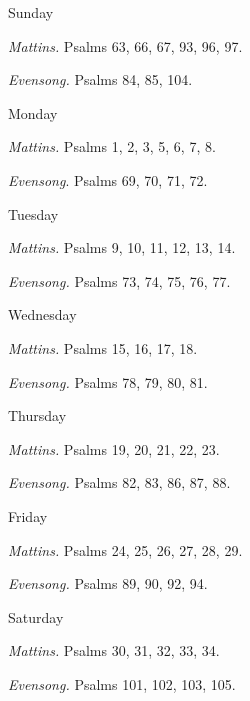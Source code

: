 \begin{paracol}{2}%
	\begin{leftcolumn}
		\begin{inhead}
			Sunday
		\end{inhead}\par\noindent
		\textit{Mattins.} Psalms 63, 66, 67, 93, 96, 97.\par\noindent
		\textit{Evensong.} Psalms 84, 85, 104.\par
		\begin{inhead}
			Monday
		\end{inhead}\par\noindent
		\textit{Mattins.} Psalms 1, 2, 3, 5, 6, 7, 8.\par\noindent
		\textit{Evensong}. Psalms 69, 70, 71, 72.\par
		\begin{inhead}
			Tuesday
		\end{inhead}\par\noindent
		\textit{Mattins.} Psalms 9, 10, 11, 12, 13, 14.\par\noindent
		\textit{Evensong.} Psalms 73, 74, 75, 76, 77.\par
		\begin{inhead}
			Wednesday
		\end{inhead}\par\noindent
		\textit{Mattins.} Psalms 15, 16, 17, 18.\par\noindent
		\textit{Evensong.} Psalms 78, 79, 80, 81.\par
		\begin{inhead}
			Thursday
		\end{inhead}\par\noindent
		\textit{Mattins.} Psalms 19, 20, 21, 22, 23.\par\noindent
		\textit{Evensong.} Psalms 82, 83, 86, 87, 88.\par
		\begin{inhead}
			Friday
		\end{inhead}\par\noindent
		\textit{Mattins.} Psalms 24, 25, 26, 27, 28, 29.\par\noindent
		\textit{Evensong.} Psalms 89, 90, 92, 94.\par
		\begin{inhead}
			Saturday
		\end{inhead}\par\noindent
		\textit{Mattins.} Psalms 30, 31, 32, 33, 34.\par\noindent
		\textit{Evensong.} Psalms 101, 102, 103, 105.\par
		

\end{leftcolumn}
\end{paracol}
